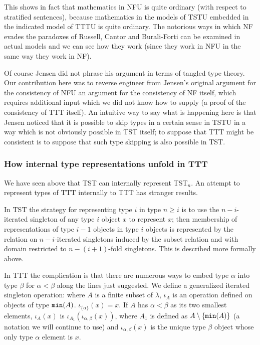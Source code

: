 \documentclass[12pt]{article}
\begin{document}
\begin{description}
This shows in fact that mathematics in NFU is quite ordinary (with respect to stratified sentences), because mathematics in the models of TSTU embedded in the indicated model of TTTU is quite ordinary.  The notorious ways in which NF evades the paradoxes of Russell, Cantor and Burali-Forti can be examined in actual models and we can see how they work (since they work in NFU in the same way they work in NF).

\end{description}

Of course Jensen did not phrase his argument in terms of tangled type theory.  Our contribution here was to reverse engineer from Jensen's original argument for the consistency of NFU an argument for the consistency of NF itself, which requires additional input which we did not know how to supply (a proof of the consistency of TTT itself).  An intuitive way to say what is happening here is that Jensen noticed that it is possible to skip types in a certain sense in TSTU in a way which is not obviously possible in TST itself;  to suppose that TTT might be consistent is to suppose that such type skipping is also possible in TST.

\subsubsection{How internal type representations unfold in TTT}

We have seen above that TST can internally represent TST$_n$.   An attempt to represent types of TTT internally to TTT has stranger results.

In TST the strategy for representing type $i$ in type $n\geq i$  is to use the $n-i$-iterated singleton of any type $i$ object $x$ to represent $x$;  then membership of representations of type $i-1$ objects in type
$i$ objects is represented by the relation on $n-i$-iterated singletons induced by the subset relation and with domain restricted to $n-(i+1)$-fold singletons.  This is described more formally above.

In TTT the complication is that there are numerous ways to embed type $\alpha$ into type $\beta$ for $\alpha<\beta$ along the lines just suggested.    We define a generalized
iterated singleton operation:  where $A$ is a finite subset of $\lambda$, $\iota_A$ is an operation defined on objects of type ${\tt min}(A)$.  $\iota_{\{\alpha\}}(x)=x$.
If $A$ has $\alpha<\beta$ as its two smallest elements, $\iota_A(x)$ is  $\iota_{A_1}(\iota_{\alpha,\beta}(x))$, where $A_1$ is defined as $A \setminus \{{\tt min}(A)\}$ (a notation we will continue to use) and $\iota_{\alpha,\beta}(x)$ is the unique type $\beta$ object whose only type $\alpha$ element is $x$.
\end{document}
